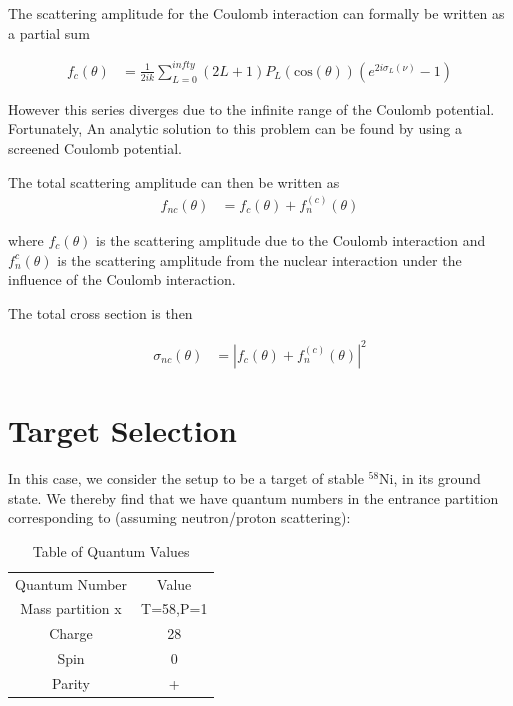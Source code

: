 \documentclass[paper=a4, fontsize=11pt]{scrartcl} %
\numberwithin{equation}{section} %
\numberwithin{figure}{section} %
\numberwithin{table}{section} %
\begin{document}
The scattering amplitude for the Coulomb interaction can formally be written as a partial sum

\begin{align*}
f_{c}\left(\theta\right) &= \frac{1}{2ik}\sum_{L=0}^{infty}\left(2L+1\right)P_{L}\left(\textrm{cos}\left(\theta\right)\right)\left(e^{2i\sigma_{L}\left(\nu\right)}-1\right)
\end{align*}

However this series diverges due to the infinite range of the Coulomb potential.  Fortunately, An analytic solution to this problem can be found by using a screened Coulomb potential.

The total scattering amplitude can then be written as 
\begin{align*}
f_{nc}\left(\theta\right) &= f_{c}\left(\theta\right) + f_{n}^{(c)}\left(\theta\right)
\end{align*}

where $f_{c}\left(\theta\right)$ is the scattering amplitude due to the Coulomb interaction and $f_{n}^{c}\left(\theta\right)$ is the scattering amplitude from the nuclear interaction under the influence of the Coulomb interaction.

The total cross section is then

\begin{align*}
\sigma_{nc}\left(\theta\right) &= |f_{c}\left(\theta\right)+f_{n}^{(c)}\left(\theta\right)|^{2}
\end{align*}




\section{Target Selection}

In this case, we consider the setup to be a target of stable $^{58}$Ni, in its ground state. We thereby find that we have quantum numbers in the entrance partition corresponding to (assuming neutron/proton scattering):\\
\begin{center}
\begin{table}[h!]
\captionsetup{font=large}
\caption{Table of Quantum Values}
\centering
\vspace{3 mm}
\begin{tabular}{|c|c|}

Quantum Number & Value \\
Mass partition x & T=58,P=1\\
Charge & 28 \\
Spin & 0\\
Parity & +


\end{tabular}
\end{table}
\end{center}
\end{document}
